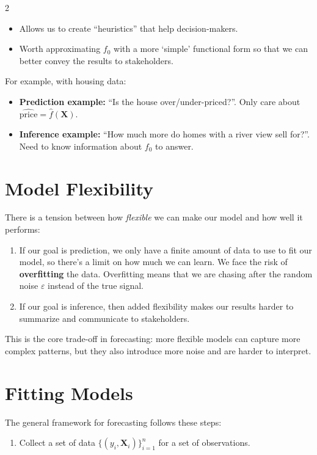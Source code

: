 \documentclass[12pt]{article}
\begin{document}
\begin{multicols}{2}
\begin{itemize}
    \item Allows us to create ``heuristics'' that help decision-makers.

    \item Worth approximating $f_0$ with a more `simple' functional form so that we can better convey the results to stakeholders.
  \end{itemize}

  For example, with housing data:
  \begin{itemize}
    \item[] \textbf{Prediction example:} ``Is the house over/under-priced?''. Only care about $\hat{\text{price}} = \hat{f}(\bm{X})$.
    \item[] \textbf{Inference example:} ``How much more do homes with a river view sell for?''.  Need to know information about $f_0$ to answer.
  \end{itemize}

  \section*{Model Flexibility}

  There is a tension between how \emph{flexible} we can make our model and how well it performs:

  \begin{enumerate}
    \item If our goal is prediction, we only have a finite amount of data to use to fit our model, so there's a limit on how much we can learn. We face the risk of \textbf{overfitting} the data.
      Overfitting means that we are chasing after the random noise $\varepsilon$ instead of the true signal.

    \item If our goal is inference, then added flexibility makes our results harder to summarize and communicate to stakeholders.
  \end{enumerate}

  This is the core trade-off in forecasting: more flexible models can capture more complex patterns, but they also introduce more noise and are harder to interpret.

  \section*{Fitting Models}

  The general framework for forecasting follows these steps:

  \begin{enumerate}
    \item Collect a set of data $\{ (y_i, \bm{X}_i) \}_{i=1}^n$ for a set of observations.


\end{enumerate}
\end{multicols}
\end{document}
